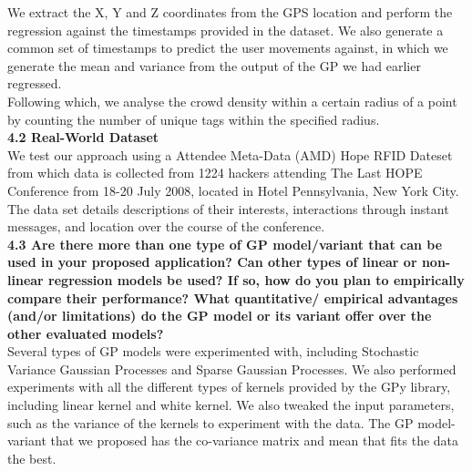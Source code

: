 \documentclass[letterpaper]{article}
\begin{document}
We extract the X, Y and Z coordinates from the GPS location and perform the regression against the timestamps provided in the dataset. We also generate a common set of timestamps to predict the user movements against, in which we generate the mean and variance from the output of the GP we had earlier regressed. \\

Following which, we analyse the crowd density within a certain radius of a point by counting the number of unique tags within the specified radius. \\  

{\bf4.2  Real-World Dataset} \\

We test our approach using a Attendee Meta-Data (AMD) Hope RFID Dateset from which data is collected from 1224 hackers attending The Last HOPE Conference from 18-20 July 2008, located in Hotel Pennsylvania, New York City. The data set details descriptions of their interests, interactions through instant messages, and location over the course of the conference. \\

{\bf4.3  Are there more than one type of GP model/variant that can be used in your proposed application? Can other types of linear or non-linear regression models be used? If so, how do you plan to empirically compare their performance? What quantitative/ empirical advantages (and/or limitations) do the GP model or its variant offer over the other evaluated models?} \\

Several types of GP models were experimented with, including Stochastic Variance Gaussian Processes and Sparse Gaussian Processes. We also performed experiments with all the different types of kernels provided by the GPy library, including linear kernel and white kernel. We also tweaked the input parameters, such as the variance of the kernels to experiment with the data. The GP model-variant that we proposed has the co-variance matrix and mean that fits the data the best. \\ 
\end{document}
